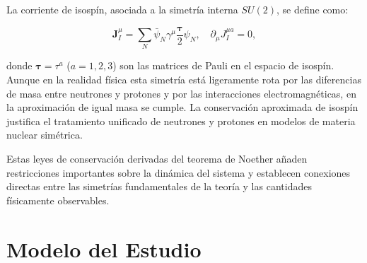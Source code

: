 La corriente de isospín, asociada a la simetría interna $SU(2)$, se define como:

\begin{equation}
	\boldsymbol{J}_I^{\mu} = \sum_N \bar{\psi}_N \gamma^\mu \frac{\boldsymbol{\tau}}{2} \psi_N, \quad \partial_\mu J_I^{\mu a} = 0,
	\label{eq:corriente_isospin}
\end{equation}

donde $\boldsymbol{\tau} = \tau^a$ ($a = 1, 2, 3$) son las matrices de Pauli en el espacio de isospín. Aunque en la realidad física esta simetría está ligeramente rota por las diferencias de masa entre neutrones y protones y por las interacciones electromagnéticas, en la aproximación de igual masa se cumple. La conservación aproximada de isospín justifica el tratamiento unificado de neutrones y protones en modelos de materia nuclear simétrica.

Estas leyes de conservación derivadas del teorema de Noether añaden restricciones importantes sobre la dinámica del sistema y establecen conexiones directas entre las simetrías fundamentales de la teoría y las cantidades físicamente observables.


\section{Modelo del Estudio}

